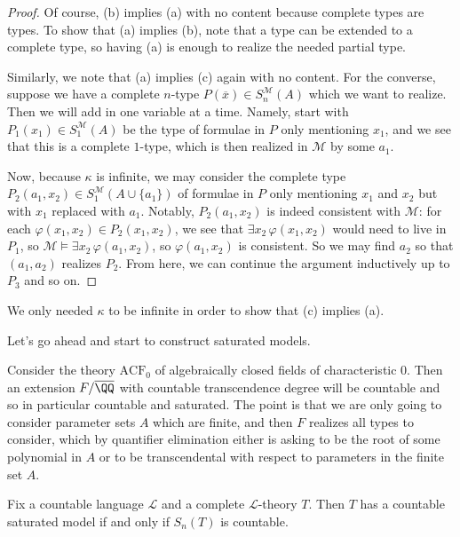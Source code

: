 \documentclass[../notes.tex]{subfiles}
\begin{document}
\begin{proof}
	Of course, (b) implies (a) with no content because complete types are types. To show that (a) implies (b), note that a type can be extended to a complete type, so having (a) is enough to realize the needed partial type.

	Similarly, we note that (a) implies (c) again with no content. For the converse, suppose we have a complete $n$-type $P(\overline x)\in S_n^\mathcal M(A)$ which we want to realize. Then we will add in one variable at a time. Namely, start with $P_1(x_1)\in S_1^\mathcal M(A)$ be the type of formulae in $P$ only mentioning $x_1$, and we see that this is a complete $1$-type, which is then realized in $\mathcal M$ by some $a_1$.

	Now, because $\kappa$ is infinite, we may consider the complete type $P_2(a_1,x_2)\in S_1^\mathcal M(A\cup\{a_1\})$ of formulae in $P$ only mentioning $x_1$ and $x_2$ but with $x_1$ replaced with $a_1$. Notably, $P_2(a_1,x_2)$ is indeed consistent with $\mathcal M$: for each $\varphi(x_1,x_2)\in P_2(x_1,x_2)$, we see that $\exists x_2\,\varphi(x_1,x_2)$ would need to live in $P_1$, so $\mathcal M\models\exists x_2\,\varphi(a_1,x_2)$, so $\varphi(a_1,x_2)$ is consistent. So we may find $a_2$ so that $(a_1,a_2)$ realizes $P_2$. From here, we can continue the argument inductively up to $P_3$ and so on.
\end{proof}
\begin{remark}
	We only needed $\kappa$ to be infinite in order to show that (c) implies (a).
\end{remark}
Let's go ahead and start to construct saturated models.
\begin{example}
	Consider the theory $\mathrm{ACF}_0$ of algebraically closed fields of characteristic $0$. Then an extension $F/\overline\QQ$ with countable transcendence degree will be countable and so in particular countable and saturated. The point is that we are only going to consider parameter sets $A$ which are finite, and then $F$ realizes all types to consider, which by quantifier elimination either is asking to be the root of some polynomial in $A$ or to be transcendental with respect to parameters in the finite set $A$.
\end{example}
\begin{theorem}
	Fix a countable language $\mathcal L$ and a complete $\mathcal L$-theory $T$. Then $T$ has a countable saturated model if and only if $S_n(T)$ is countable.
\end{theorem}
\end{document}
